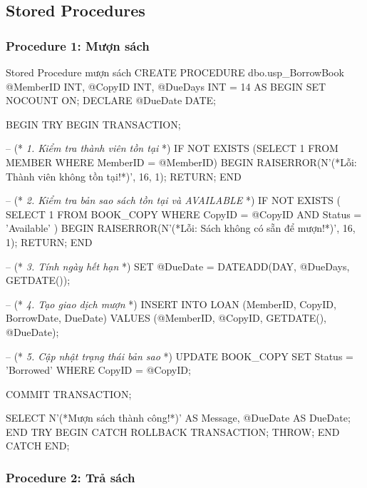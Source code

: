 \documentclass[12pt,a4paper]{article}
\newcommand{\vncomment}[1]{\textit{\color{green!50!black}#1}}
\begin{document}
\subsection{Stored Procedures}

\subsubsection{Procedure 1: Mượn sách}

\begin{sqlcode}{Stored Procedure mượn sách}
CREATE PROCEDURE dbo.usp_BorrowBook
    @MemberID    INT,
    @CopyID      INT,
    @DueDays     INT = 14
AS
BEGIN
    SET NOCOUNT ON;
    DECLARE @DueDate DATE;

    BEGIN TRY
        BEGIN TRANSACTION;

        -- (* \vncomment{1. Kiểm tra thành viên tồn tại} *)
        IF NOT EXISTS (SELECT 1 FROM MEMBER WHERE MemberID = @MemberID)
        BEGIN
            RAISERROR(N'(*Lỗi: Thành viên không tồn tại!*)', 16, 1);
            RETURN;
        END

        -- (* \vncomment{2. Kiểm tra bản sao sách tồn tại và AVAILABLE} *)
        IF NOT EXISTS (
            SELECT 1 FROM BOOK_COPY
            WHERE CopyID = @CopyID AND Status = 'Available'
        )
        BEGIN
            RAISERROR(N'(*Lỗi: Sách không có sẵn để mượn!*)', 16, 1);
            RETURN;
        END

        -- (* \vncomment{3. Tính ngày hết hạn} *)
        SET @DueDate = DATEADD(DAY, @DueDays, GETDATE());

        -- (* \vncomment{4. Tạo giao dịch mượn} *)
        INSERT INTO LOAN (MemberID, CopyID, BorrowDate, DueDate)
        VALUES (@MemberID, @CopyID, GETDATE(), @DueDate);

        -- (* \vncomment{5. Cập nhật trạng thái bản sao} *)
        UPDATE BOOK_COPY
        SET Status = 'Borrowed'
        WHERE CopyID = @CopyID;

        COMMIT TRANSACTION;

        SELECT N'(*Mượn sách thành công!*)' AS Message,
               @DueDate AS DueDate;
    END TRY
    BEGIN CATCH
        ROLLBACK TRANSACTION;
        THROW;
    END CATCH
END;
\end{sqlcode}

\subsubsection{Procedure 2: Trả sách}
\end{document}
